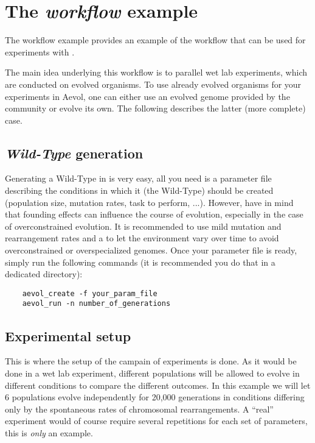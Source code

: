 \section{The \emph{workflow} example}

The workflow example provides an example of the workflow that can be used for experiments with \aevol{}.

The main idea underlying this workflow is to parallel wet lab experiments, which are conducted on evolved organisms.
To use already evolved organisms for your experiments in Aevol, one can either use an evolved genome provided by the community or evolve its own. The following describes the latter (more complete) case.


\subsection{\emph{Wild-Type} generation}
Generating a Wild-Type in \aevol{} is very easy, all you need is a parameter file describing the conditions in which it (the Wild-Type) should be created (population size, mutation rates, task to perform, ...).
However, have in mind that founding effects can influence the course of evolution, especially in the case of overconstrained evolution. It is recommended to use mild mutation and rearrangement rates and a to let the environment vary over time to avoid overconstrained or overspecialized genomes.
Once your parameter file is ready, simply run the following commands (it is recommended you do that in a dedicated directory):

\begin{verbatim}
	aevol_create -f your_param_file
	aevol_run -n number_of_generations
\end{verbatim}



\subsection{Experimental setup}
This is where the setup of the campain of experiments is done.
As it would be done in a wet lab experiment, different populations will be allowed to evolve in different conditions to compare the different outcomes. In this example we will let 6 populations evolve independently for 20,000 generations in conditions differing only by the spontaneous rates of chromosomal rearrangements. A ``real'' experiment would of course require several repetitions for each set of parameters, this is \emph{only} an example.

